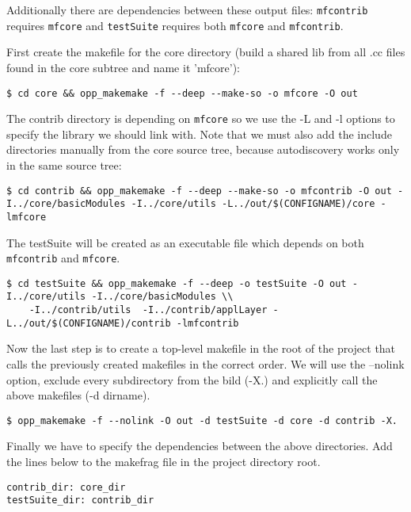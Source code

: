 Additionally there are dependencies between these output files: \texttt{mfcontrib}
requires \texttt{mfcore} and \texttt{testSuite} requires both \texttt{mfcore}
and \texttt{mfcontrib}.

First create the makefile for the core directory (build a shared lib from all .cc files
found in the core subtree and name it 'mfcore'):

\begin{verbatim}
$ cd core && opp_makemake -f --deep --make-so -o mfcore -O out
\end{verbatim}

The contrib directory is depending on \texttt{mfcore} so we use the -L and -l options
to specify the library we should link with. Note that we must also add
the include directories manually from the core source tree, because autodiscovery works only
in the same source tree:

\begin{verbatim}
$ cd contrib && opp_makemake -f --deep --make-so -o mfcontrib -O out -I../core/basicModules -I../core/utils -L../out/$(CONFIGNAME)/core -lmfcore
\end{verbatim}

The testSuite will be created as an executable file which depends on both
\texttt{mfcontrib} and \texttt{mfcore}.

\begin{verbatim}
$ cd testSuite && opp_makemake -f --deep -o testSuite -O out -I../core/utils -I../core/basicModules \\
    -I../contrib/utils  -I../contrib/applLayer -L../out/$(CONFIGNAME)/contrib -lmfcontrib
\end{verbatim}

Now the last step is to create a top-level makefile in the root of the project that
calls the previously created makefiles in the correct order. We will use the
--nolink option, exclude every subdirectory from the bild (-X.) and explicitly call
the above makefiles (-d dirname).

\begin{verbatim}
$ opp_makemake -f --nolink -O out -d testSuite -d core -d contrib -X.
\end{verbatim}

Finally we have to specify the dependencies between the above directories. Add the lines below to the makefrag file
in the project directory root.

\begin{verbatim}
contrib_dir: core_dir
testSuite_dir: contrib_dir
\end{verbatim}

